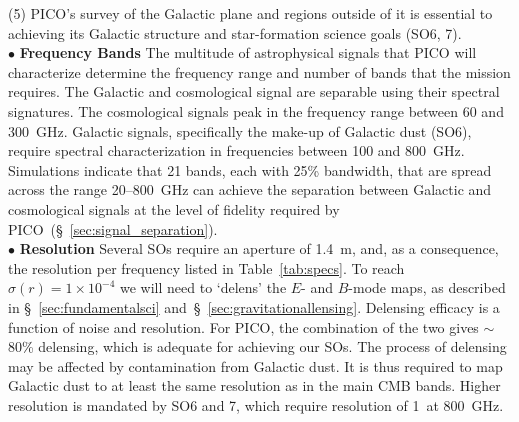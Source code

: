 \documentclass[PICOReport.tex]{subfiles}
\begin{document}
(5) PICO's survey of the Galactic plane and regions outside of it is essential to achieving its Galactic structure  and star-formation science goals (SO6, 7). \\
%
$\bullet$ {\bf Frequency Bands} \hspace{0.1in} The multitude of astrophysical signals that PICO will characterize determine the frequency range and number of bands that the mission requires. The Galactic and cosmological signal are separable using their spectral signatures. The cosmological signals peak in the frequency range between 60 and 300~GHz. Galactic signals, specifically the make-up of Galactic dust (SO6), require spectral characterization in frequencies between 100 and 800~GHz. Simulations indicate that 21 bands, each with 25\% bandwidth, that are spread across the range 20--800~GHz can achieve the separation between Galactic and cosmological signals at the level of fidelity required by PICO~(\S~\ref{sec:signal_separation}). \\
%
$\bullet$ {\bf Resolution} \hspace{0.1in} 
Several \ac{SOs} require an aperture of 1.4~m, and, as a consequence, the resolution per frequency listed in Table~\ref{tab:specs}. To reach $\sigma(r) = 1\times10^{-4}$ we will need to `delens' the $E$- and $B$-mode maps, as described in \S~\ref{sec:fundamentalsci} and~\S~\ref{sec:gravitationallensing}. Delensing efficacy is a function of noise and resolution. For PICO, the combination of the two gives $\sim$80\% delensing, which is adequate for achieving our \ac{SOs}. The process of delensing may be affected by contamination from Galactic dust. It is thus required to map Galactic dust to at least the same resolution as in the main CMB bands.  Higher resolution is mandated by SO6 and 7, which require resolution of 1\arcmin\ at 800~GHz. 
\end{document}
